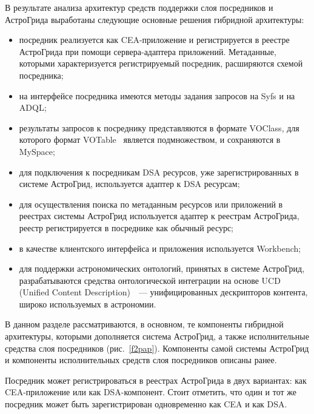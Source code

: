 \begin{multicols}{2}
     В результате анализа архитектур средств поддержки слоя посредников и АстроГрида
выработаны следующие основные решения гибридной архитектуры:
     \begin{itemize}
\item посредник реализуется как CEA-приложение и регистрируется в реестре
АстроГрида при помощи сервера-адаптера приложений. Метаданные, которыми
характеризуется регистрируемый посредник, расширяются схемой посредника;\\[-14pt]
\item на интерфейсе посредника имеются методы задания запросов на Syfs и на ADQL;\\[-14pt]
\item результаты запросов к посреднику представляются в формате VOClass, для
которого формат VOTable~\cite{VOarch} является подмножеством, и сохраняются в
MySpace;\\[-14pt]
\item для подключения к посредникам DSA ресурсов, уже зарегистрированных в
системе АстроГрид, используется адаптер к DSA ресурсам;\\[-14pt]
\item для осуществления поиска по метаданным ресурсов или приложений в реестрах
системы АстроГрид используется адаптер к реестрам Аст\-ро\-Гри\-да, реестр
регистрируется в посреднике как обычный ресурс;\\[-14pt]
\item в качестве клиентского интерфейса и приложения используется Workbench;\\[-14pt]
\item для поддержки астрономических онтологий, принятых в системе АстроГрид,
разрабатываются средства онтологической интеграции на основе
UCD (Unified Content Description)~\cite{VOarch}~--- унифицированных дескрипторов контента, широко
используемых в астрономии.
\end{itemize}

     В данном разделе рассматриваются, в основном, те компоненты гибридной
архитектуры, которыми дополняется система АстроГрид, а также исполнительные
средства слоя посредников (рис.~\ref{f2pap}). Компоненты самой системы АстроГрид и
компоненты исполнительных средств слоя посредников описаны ранее.


Посредник может регистрироваться в реестрах АстроГрида в двух вариантах: как
CEA-при\-ло\-же\-ние или как DSA-компонент. Стоит отметить,
что один и тот же посредник может быть зарегистрирован одновременно
как CEA и как DSA.


\end{multicols}
